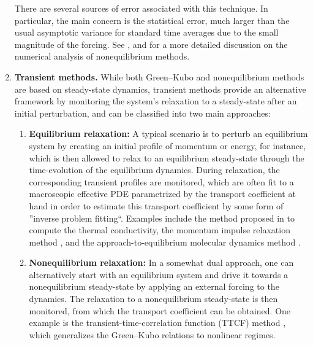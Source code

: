 \begin{enumerate}
   There are several sources of error associated with this technique. In particular, the main concern is the statistical error, much larger than the usual asymptotic variance for standard time averages due to the small magnitude of the forcing. See \cite[Section 5]{acta_numerica2016}, \cite[Section 2]{synthetic2023} and \cite[Section 3]{averages2016} for a more detailed discussion on the numerical analysis of nonequilibrium methods.
   
    \item {\bf Transient methods.} While both Green--Kubo and nonequilibrium methods are based on steady-state dynamics, transient methods provide an alternative framework by monitoring the system’s relaxation to a steady-state after an initial perturbation, and can be classified into two main approaches:
    
    \begin{enumerate}%
        \item {\bf Equilibrium relaxation:} A typical scenario is to perturb an equilibrium system by creating an initial profile of momentum or energy, for instance, which is then allowed to relax to an equilibrium steady-state through the time-evolution of the equilibrium dynamics. During relaxation, the corresponding transient profiles are monitored, which are often fit to a macroscopic effective PDE parametrized by the transport coefficient at hand in order to estimate this transport coefficient by some form of ''inverse problem fitting``. Examples include the method proposed in \cite{hulse2005} to compute the thermal conductivity, the momentum impulse relaxation method \cite{MIR2000}, and the approach-to-equilibrium molecular dynamics method \cite{AEMD2013}.
                
        \item {\bf Nonequilibrium relaxation:} In a somewhat dual approach, one can alternatively start with an equilibrium system and drive it towards a nonequilibrium steady-state by applying an external forcing to the dynamics. The relaxation to a nonequilibrium steady-state is then monitored, from which the transport coefficient can be obtained. One example is the transient-time-correlation function (TTCF) method \cite{TTCF1987,TTCF1988}, which generalizes the Green--Kubo relations to nonlinear regimes.
    \end{enumerate}
\end{enumerate}
%
